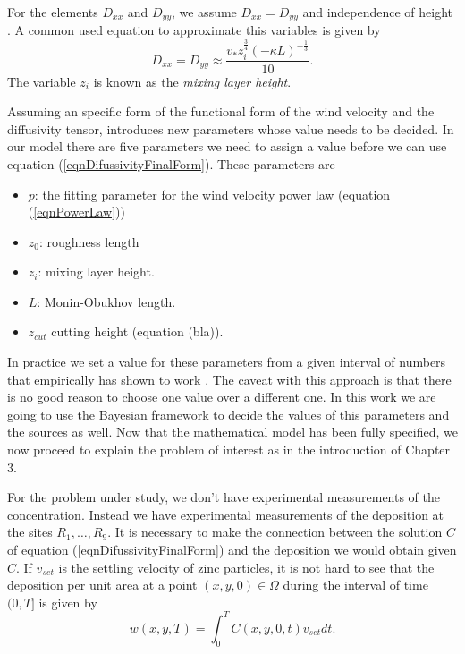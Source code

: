 \documentclass[12pt]{book}
\begin{document}
For the elements $D_{xx}$ and $D_{yy}$, we assume $D_{xx}=D_{yy}$ and independence of height 
\cite{monin1954basic}. A common used equation
to approximate this variables is given by
\begin{equation*}
D_{xx}=D_{yy}\approx \frac{v_{*}z_{i}^{\frac{3}{4}}(-\kappa L)^{-\frac{1}{3}}}{10}.
\end{equation*}
The variable $z_{i}$ is known as the \textit{mixing layer height}.


Assuming an specific form of the functional form of the wind velocity and the  
diffusivity tensor, introduces new parameters whose value needs to be decided. In our model
there are five parameters we need to assign a value before we can use equation (\ref{eqnDifussivityFinalForm}).
These parameters are
\begin{itemize}
\item $p$: the fitting parameter for the wind velocity power law (equation (\ref{eqnPowerLaw}))
\item $z_{0}$: roughness length
\item $z_{i}$: mixing layer height.
\item $L$: Monin-Obukhov length.
\item $z_{cut}$ cutting height (equation (bla)).
\end{itemize}
In practice we set a value for these parameters from a given interval of numbers
that empirically has shown to work \cite{seinfeld1998atmospheric,hosseini2016airborne}.
The caveat with this approach is that there is no good reason to choose one value
over a different one. In this work we are going to use the Bayesian framework
to decide the values of this parameters and the sources as well.
Now that the mathematical model has been fully specified, we now proceed to explain
the problem of interest as in the introduction of Chapter 3.
\newline

For the problem under study, we don't have experimental measurements of the concentration.
Instead we have experimental measurements of the deposition at the sites $R_{1},\ldots,R_{9}$.
It is necessary to make the connection between the solution $C$ of equation (\ref{eqnDifussivityFinalForm})
and the deposition we would obtain given $C$. If $v_{set}$ is the settling velocity of zinc particles,
it is not hard to see that the deposition per unit area at a point $(x,y,0)\in\Omega$ during the interval of time $(0,T]$ is given by
\begin{equation*}
w(x,y,T)=\int_{0}^{T}C(x,y,0,t)v_{set}dt.
\end{equation*}
\end{document}
